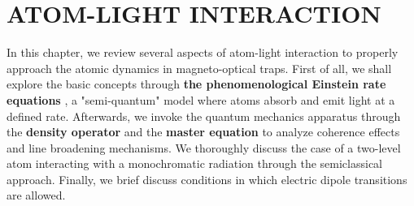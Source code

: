 %
\chapter{ATOM-LIGHT INTERACTION}
\label{ch:atom-light-interaction}
%

In this chapter, we review several aspects of atom-light interaction \cite{weiner2003light} to properly approach the atomic dynamics in magneto-optical traps. First of all, we shall explore the basic concepts through \textbf{the phenomenological Einstein rate equations} \cite{foot2005atomic}, a "semi-quantum" model where atoms absorb and emit light at a defined rate. Afterwards, we invoke the quantum mechanics apparatus through the \textbf{density operator} and the \textbf{master equation} \cite{steck2007quantum} to analyze coherence effects and line broadening mechanisms. We thoroughly discuss the case of a two-level atom interacting with a monochromatic radiation through the semiclassical approach. Finally, we brief discuss conditions in which electric dipole transitions are allowed.



%




